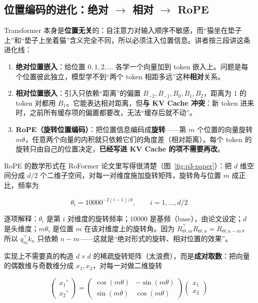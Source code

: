 \subsection{位置编码的进化：绝对 $\rightarrow$ 相对 $\rightarrow$ RoPE}

Transformer 本身是\textbf{位置无关}的：自注意力对输入顺序不敏感，而“猫坐在垫子上”和“垫子上坐着猫”含义完全不同，所以必须注入位置信息。讲者按三段讲这条进化线：

\begin{enumerate}
\item \textbf{绝对位置嵌入}：给位置 $0,1,2,\dots$ 各学一个向量加到 token 嵌入上。问题是每个位置彼此独立，模型学不到“两个 token 相距多远”这种\textbf{相对}关系。
\item \textbf{相对位置嵌入}：引入只依赖“距离”的偏置 $B_{-2},B_{-1},B_0,B_1,B_2$，距离为 1 的 token 对都用 $B_1$。它能表达相对距离，但\textbf{与 KV Cache 冲突}：新 token 进来时，之前所有缓存项的偏置都要改，无法“缓存后就不动”。
\item \textbf{RoPE（旋转位置编码）}：把位置信息编码成\textbf{旋转}——第 $m$ 个位置的向量旋转 $m\theta$，任意两个向量的内积就只依赖它们的角度差（相对距离）。每个 token 的旋转只由自己的位置决定，\textbf{已经写进 KV Cache 的项不需要再改}。
\end{enumerate}

RoPE 的数学形式在 RoFormer 论文里写得很清楚（图~\ref{fig:p3-paper}）：把 $d$ 维空间分成 $d/2$ 个二维子空间，对每一对维度施加旋转矩阵，旋转角与位置 $m$ 成正比，频率为

$$\theta_i = 10000^{-2(i-1)/d},\qquad i = 1,\dots,d/2$$

逐项解释：$\theta_i$ 是第 $i$ 对维度的旋转频率；$10000$ 是基频（base），由论文设定；$d$ 是头维度；$m\theta_i$ 是位置 $m$ 在该对维度上的旋转角。因为 $R_{\Theta,m}^{\top}R_{\Theta,n}=R_{\Theta,n-m}$，所以 $q_m^{\top}k_n$ 只依赖 $n-m$——这就是“绝对形式的旋转、相对位置的效果”。

实现上不需要真的构造 $d\times d$ 的稀疏旋转矩阵（太浪费），而是\textbf{成对取数}：把向量的偶数维与奇数维分成 $x_1,x_2$，对每一对做二维旋转

$$\begin{pmatrix}x_1'\\x_2'\end{pmatrix}=\begin{pmatrix}\cos(m\theta) & -\sin(m\theta)\\ \sin(m\theta) & \cos(m\theta)\end{pmatrix}\begin{pmatrix}x_1\\x_2\end{pmatrix}$$

